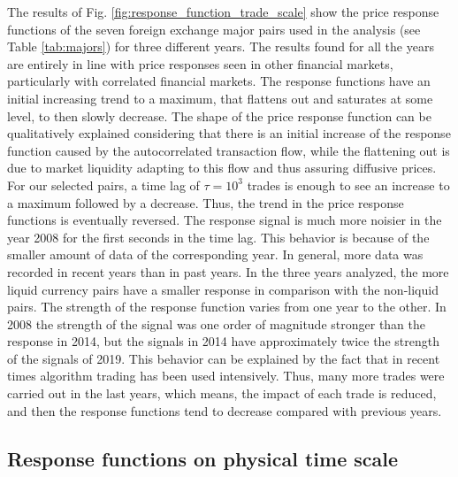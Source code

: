 The results of Fig. \ref{fig:response_function_trade_scale} show the
price response functions of the seven foreign exchange major pairs used in the
analysis (see Table \ref{tab:majors}) for three different years. The results
found for all the years are entirely in line with price responses seen in other
financial markets, particularly with correlated financial markets. The response
functions have an initial increasing trend to a maximum, that flattens out and
saturates at some level, to then slowly decrease. The shape of the price
response function can be qualitatively explained considering that there is an
initial increase of the response function caused by the autocorrelated
transaction flow, while the flattening out is due to market liquidity adapting
to this flow and thus assuring diffusive prices. For our selected pairs, a time
lag of $\tau = 10^{3} $ trades is enough to see an increase to a maximum
followed by a decrease. Thus, the trend in the price response functions is
eventually reversed. The response signal is much more noisier in the year 2008
for the first seconds in the time lag. This behavior is because of the smaller
amount of data of the corresponding year. In general, more data was recorded in
recent years than in past years. In the three years analyzed, the more liquid
currency pairs have a smaller response in comparison with the non-liquid pairs.
The strength of the response function varies from one year to the other. In
2008 the strength of the signal was one order of magnitude stronger than the
response in 2014, but the signals in 2014 have approximately twice the strength
of the signals of 2019. This behavior can be explained by the fact that in
recent times algorithm trading has been used intensively. Thus, many more
trades were carried out in the last years, which means, the impact of each
trade is reduced, and then the response functions tend to decrease compared
with previous years.

\subsection{Response functions on physical time scale}
\label{subsec:response_function_physical}

